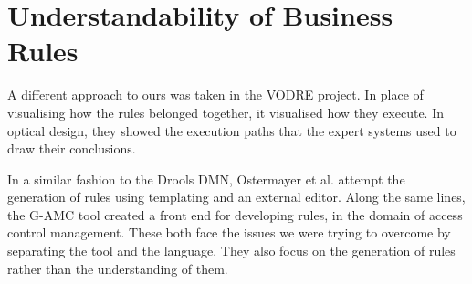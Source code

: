 \section{Understandability of Business Rules}  

A different approach to ours was taken in the VODRE project\cite{lapaev2014vodre}.
In place of visualising how the rules belonged together, it visualised how they execute.
In optical design, they showed the execution paths that the expert systems used to draw their conclusions.

In a similar fashion to the Drools DMN, Ostermayer et al.\cite{ostermayer2013simplifying} attempt the generation of rules using templating and an external editor.
Along the same lines, the G-AMC tool\cite{sa2016g} created a front end for developing rules, in the domain of access control management.
These both face the issues we were trying to overcome by separating the tool and the language. 
They also focus on the generation of rules rather than the understanding of them.
